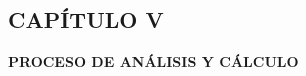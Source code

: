 \begin{center}
    \section*{CAPÍTULO V}
    \vspace*{0.5in}
    \textbf{PROCESO DE ANÁLISIS Y CÁLCULO}
\end{center}

\newpage